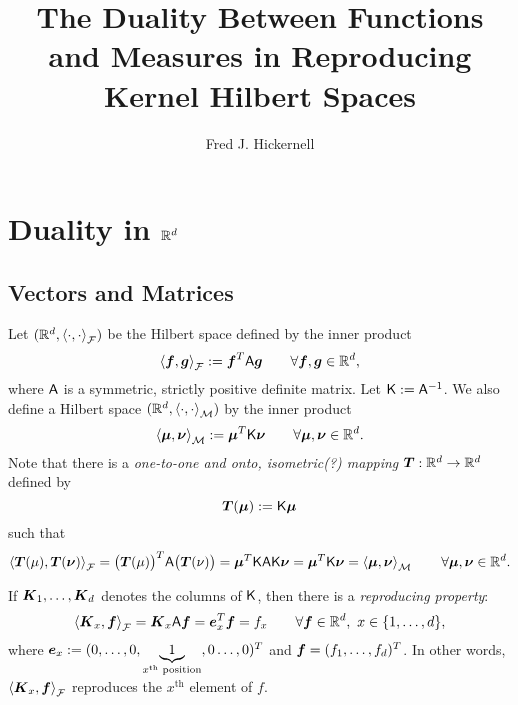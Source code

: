 \documentclass[reqno]{amsart}
\begin{document}
\title{The Duality Between Functions and Measures in Reproducing Kernel Hilbert Spaces}
\author{Fred J. Hickernell}


\maketitle

\section{Duality in $\reals^d$}

\subsection{Vectors and Matrices}

Let $(\reals^d,\ip[\cf]{\cdot}{\cdot})$ be the Hilbert space defined by the inner product 
\begin{equation*}
    \ip[\cf]{\vf}{\vg} := \vf^T \mA \vg \qquad \forall \vf, \vg \in \reals^d,
\end{equation*}
where $\mA$ is a symmetric, strictly positive definite matrix.  Let $\mK :=  \mA^{-1}$.  We also define a Hilbert space $(\reals^d,\ip[\cm]{\cdot}{\cdot})$ by the inner product
\begin{equation*}
    \ip[\cm]{\vmu}{\vnu} := \vmu^T \mK \vnu \qquad \forall \vmu, \vnu \in \reals^d.
\end{equation*}
Note that there is a \emph{one-to-one and onto, isometric(?) mapping} $\vT: \reals^d \to \reals^d$ defined by 
\[
\vT(\vmu) := \mK \vmu
\]
such that 
\begin{equation*}
    \ip[\cf]{\vT(\mu)}{\vT(\vnu)} = \bigl(\vT(\mu)\bigr)^T \mA \bigl(\vT(\nu)\bigr) = \vmu^T \mK \mA \mK \vnu = \vmu^T \mK \vnu = \ip[\cm]{\vmu}{\vnu} \qquad \forall \vmu, \vnu \in \reals^d.
\end{equation*}


If $\vK_1, \ldots, \vK_d$ denotes the columns of $\mK$, then there is a \emph{reproducing property}:
\begin{equation*}
    \ip[\cf]{\vK_x}{\vf} = \vK_x \mA \vf = \ve_x^T \vf = f_x \qquad \forall \vf \in \reals^d, \ x \in \{1, \ldots, d\},
\end{equation*}
where $\ve_x := (0, \ldots, 0,\underbrace{1}_{x^{\text{th}} \text{ position}}, 0 \ldots, 0)^T$ and $\vf = (f_1, \ldots, f_d)^T$.  In other words, $ \ip[\cf]{\vK_x}{\vf}$ reproduces the $x^{\text{th}}$ element of $f$.
\end{document}
